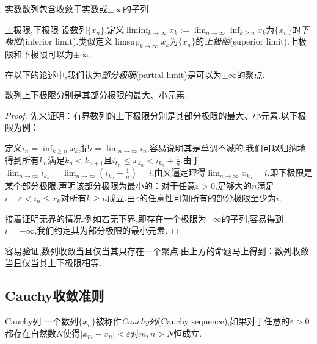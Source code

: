 \begin{proposition}{}
	实数数列包含收敛于实数或$\pm \infty$的子列.
\end{proposition}

\begin{definition}{上极限,下极限}
	设数列$\{ x_n \}$,定义$\liminf_{k\to \infty} x_k:=\lim_{n\to \infty} \inf_{k \geq n} x_k$为$\{ x_n \}$的\textit{下极限}(inferior limit).类似定义$\limsup_{k\to \infty} x_k$为$\{ x_n \}$的\textit{上极限}(superior limit).上极限和下极限可以为$\pm \infty$.
\end{definition}

在以下的论述中,我们认为\textit{部分极限}(partial limit)是可以为$\pm \infty$的聚点.

\begin{proposition}{}
	数列上下极限分别是其部分极限的最大、小元素.
\end{proposition}
\begin{proof}
	先来证明：有界数列的上下极限分别是其部分极限的最大、小元素.以下极限为例：
	
	定义$i_n=\inf_{k\geq n}x_k$,记$i=\lim_{n\to \infty} i_{n}$,容易说明其是单调不减的.我们可以归纳地得到所有$k_n$满足$k_n<k_{n+1}$且$i_{k_n} \leq x_{k_n} < i_{k_n}+\frac{1}{n}$.由于$\lim_{n\to \infty} i_{k_n} = \lim_{n\to \infty} (i_{k_n}+\frac{1}{n} ) = i$,由夹逼定理得$\lim_{n\to \infty} x_{k_n}=i$,即下极限是某个部分极限.声明该部分极限为最小的：对于任意$\varepsilon >0$,足够大的$n$满足$i-\varepsilon < i_n \leq x_k$对所有$k \geq n$成立.由$\varepsilon$的任意性可知所有的部分极限至少为$i$.
	
	接着证明无界的情况.例如若无下界,即存在一个极限为$-\infty$的子列,容易得到$i=-\infty$,我们约定其为部分极限的最小元素.
\end{proof}

容易验证,数列收敛当且仅当其只存在一个聚点.由上方的命题马上得到：数列收敛当且仅当其上下极限相等.

\subsection{Cauchy收敛准则}

\begin{definition}{Cauchy列}
	一个数列$\{ x_n \}$被称作\textit{Cauchy列}(Cauchy sequence),如果对于任意的$\varepsilon >0$都存在自然数$N$使得$|x_m-x_n|<\varepsilon$对$m,n>N$恒成立.
\end{definition}

